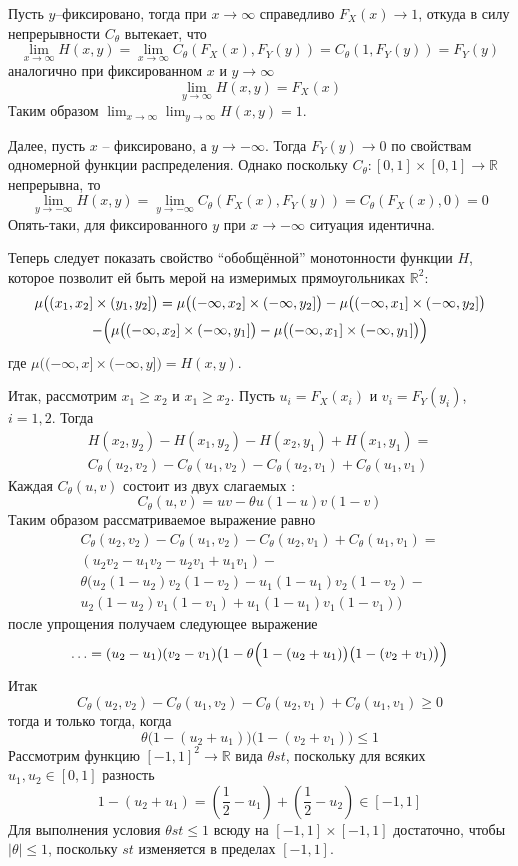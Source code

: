 \documentclass[a4paper]{article}
\newcommand{\Real}{\mathbb{R}}
\begin{document}
Пусть $y$--фиксировано, тогда при $x\to \infty$ справедливо $F_X(x)\to 1$, откуда в
силу непрерывности $C_\theta$ вытекает, что
\[
\lim_{x\to\infty} H(x,y)
= \lim_{x\to\infty} C_\theta(F_X(x),F_Y(y))
= C_\theta(1,F_Y(y))
= F_Y(y)
\]
аналогично при фиксированном $x$ и $y\to \infty$
\[\lim_{y\to\infty} H(x,y) = F_X(x)\]
Таким образом $\lim_{x\to\infty} \lim_{y\to\infty} H(x,y) = 1$.

Далее, пусть $x$ -- фиксировано, а $y\to -\infty$. Тогда $F_Y(y)\to 0$ по свойствам
одномерной функции распределения. Однако поскольку $C_\theta:[0,1]\times [0,1]\to \Real$
непрерывна, то
\[
\lim_{y\to-\infty} H(x,y)
= \lim_{y\to-\infty} C_\theta(F_X(x),F_Y(y))
= C_\theta(F_X(x),0)
= 0
\]
Опять-таки, для фиксированного $y$ при $x\to-\infty$ ситуация идентична.

Теперь следует показать свойство ``обобщённой'' монотонности функции $H$, которое
позволит ей быть мерой на измеримых прямоугольниках $\Real^2$:
\begin{multline*}
\mu\bigl((x_1,x_2]\times (y_1,y_2]\bigr)
= \mu\bigl((-\infty,x_2]\times (-\infty,y_2]\bigr)
- \mu\bigl((-\infty,x_1]\times (-\infty,y_2]\bigr) \\
- \Bigl( \mu\bigl((-\infty,x_2]\times (-\infty,y_1]\bigr)
	- \mu\bigl((-\infty,x_1]\times (-\infty,y_1]\bigr) \Bigr)
\end{multline*}
где $\mu\bigl((-\infty,x]\times (-\infty,y]\bigr) = H(x,y)$.

Итак, рассмотрим $x_1\geq x_2$ и $x_1\geq x_2$. Пусть $u_i=F_X(x_i)$ и $v_i=F_Y(y_i)$,
$i=1,2$. Тогда
\begin{multline*}
H(x_2,y_2) - H(x_1,y_2) - H(x_2,y_1) + H(x_1,y_1)
=  \\ C_\theta(u_2,v_2) - C_\theta(u_1,v_2) - C_\theta(u_2,v_1) + C_\theta(u_1,v_1)
\end{multline*}
Каждая $C_\theta(u,v)$ состоит из двух слагаемых :
\[C_\theta(u,v) = uv - \theta u(1-u) v(1-v)\]
Таким образом рассматриваемое выражение равно
\begin{multline*}
	C_\theta(u_2,v_2) - C_\theta(u_1,v_2) - C_\theta(u_2,v_1) + C_\theta(u_1,v_1) = \\
	( u_2v_2 - u_1v_2 - u_2v_1 + u_1v_1 ) - \\
		\theta ( u_2(1-u_2) v_2(1-v_2) - u_1(1-u_1) v_2(1-v_2) - \\ u_2(1-u_2) v_1(1-v_1) + u_1(1-u_1) v_1(1-v_1) )
\end{multline*}
после упрощения получаем следующее выражение
\[\ldots = (u_2-u_1)(v_2-v_1) \bigl( 1 - \theta \Bigl( 1 - (u_2 + u_1) \bigr)\bigl( 1 - (v_2 + v_1) \bigr) \Bigr)\]
Итак
\[C_\theta(u_2,v_2) - C_\theta(u_1,v_2) - C_\theta(u_2,v_1) + C_\theta(u_1,v_1) \geq 0\]
тогда и только тогда, когда
\[
\theta \bigl( 1 - (u_2 + u_1) \bigr)\bigl( 1 - (v_2 + v_1) \bigr)\leq 1
\]
Рассмотрим функцию $[-1,1]^2\to\Real$ вида $\theta s t$, поскольку для всяких
$u_1,u_2\in[0,1]$ разность
\[1 - (u_2 + u_1) = (\frac{1}{2}-u_1)+(\frac{1}{2}-u_2)\in [-1,1]\]
Для выполнения условия $\theta st\leq 1$ всюду на $[-1,1]\times [-1,1]$ достаточно,
чтобы $\lvert \theta\rvert\leq1$, поскольку $st$ изменяется в пределах $[-1,1]$.
\end{document}
